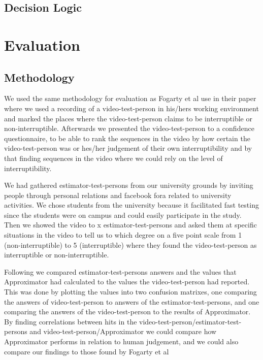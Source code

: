 \documentclass{sigchi}
\begin{document}
\subsection{Decision Logic}

\section{Evaluation}

\subsection{Methodology}
We used the same methodology for evaluation as Fogarty et al use in their paper\cite{Fogarty:2005:PHI:1057237.1057243} where we used a recording of a video-test-person in his/hers working environment and marked the places where the video-test-person claims to be interruptible or non-interruptible. Afterwards we presented the video-test-person to a confidence questionnaire, to be able to rank the sequences in the video by how certain the video-test-person was or hes/her judgement of their own interruptibility and by that finding sequences in the video where we could rely on the level of interruptibility.

We had gathered estimator-test-persons from our university grounds by inviting people through personal relations and facebook fora related to university activities.
We chose students from the university because it facilitated fast testing since the students were on campus and could easily participate in the study.
Then we showed the video to x estimator-test-persons and asked them at specific situations in the video to tell us to which degree on a five point scale from 1 (non-interruptible) to 5 (interruptible) where they found the video-test-person as interruptible or non-interruptible.

Following we compared estimator-test-persons answers and the values that Approximator had calculated to the values the video-test-person had reported. 
This was done by plotting the values into two confusion matrixes, one comparing the answers of video-test-person to answers of the estimator-test-persons, and one comparing the answers of the video-test-person to the results of Approximator.
By finding correlations between hits in the video-test-person/estimator-test-persons and video-test-person/Approximator we could compare how Approximator performs in relation to human judgement, and we could also compare our findings to those found by Fogarty et al \cite{Fogarty:2005:PHI:1057237.1057243}
\end{document}
